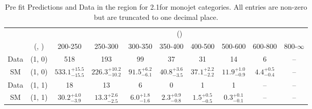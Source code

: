 \begin{table}[h!]
\tiny
\centering
\caption{Pre fit Predictions and Data in the \mmj region for 2.1\ifb for monojet categories. All entries are non-zero but are truncated to one decimal place.\label{tab:predallqcdnaive_mumu_comb_mono}}
\begin{tabular}
{cccccccccc}
	\hline\hline
	&	& \multicolumn{8}{c}{\scalht (\gev)}\\ 
	&	 (\njet, \nb) & 200-250 & 250-300 & 300-350 & 350-400 & 400-500 & 500-600 & 600-800 & 800-$\infty$ \\ [0.8ex] 
\hline
	Data & (1, 0) & 518 & 193 & 99 & 37 & 31 & 14 & 6 & -- \\[0.5ex] 
	SM & (1, 0) & $533.1^{+ 15.5 }_{- 15.5 }$ & $226.3^{+ 10.2 }_{- 10.2 }$ & $91.5^{+ 6.2 }_{- 6.1 }$ & $40.8^{+ 3.6 }_{- 3.5 }$ & $37.1^{+ 2.2 }_{- 2.2 }$ & $11.9^{+ 1.0 }_{- 0.9 }$ & $4.4^{+ 0.5 }_{- 0.4 }$ & -- \\[0.5ex] 
	Data & (1, 1) & 18 & 13 & 6 & 0 & 1 & 1 & -- & -- \\[0.5ex] 
	SM & (1, 1) & $30.2^{+ 4.0 }_{- 3.9 }$ & $13.3^{+ 2.6 }_{- 2.5 }$ & $6.0^{+ 1.8 }_{- 1.6 }$ & $2.3^{+ 0.9 }_{- 0.8 }$ & $1.5^{+ 0.5 }_{- 0.5 }$ & $0.3^{+ 0.1 }_{- 0.1 }$ & -- & -- \\[0.5ex] 
	\hline
	\hline
\end{tabular}
\end{table}
